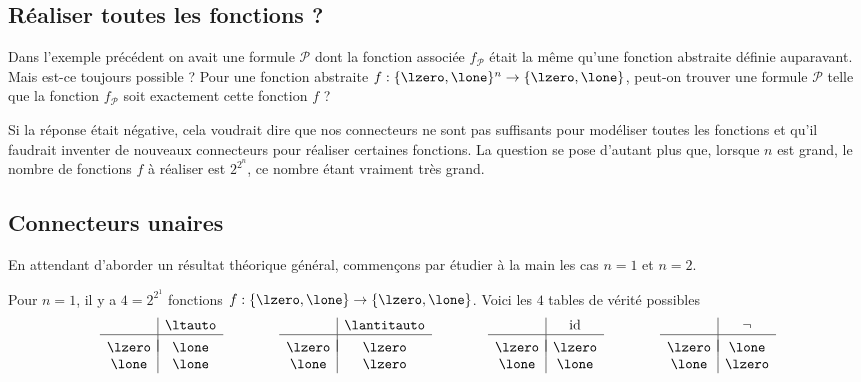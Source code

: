 \documentclass[11pt,class=report,crop=false]{standalone}
\begin{document}
\subsection{Réaliser toutes les fonctions ?}

Dans l'exemple précédent on avait une formule $\mathcal{P}$  dont la fonction associée $f_{\mathcal{P}}$ était la même qu'une fonction abstraite définie auparavant.
Mais est-ce toujours possible ?
Pour une fonction abstraite $f: \{\lzero,\lone\}^n \to \{\lzero,\lone\}$, peut-on trouver une formule $\mathcal{P}$ telle que la fonction $f_{\mathcal{P}}$ soit exactement cette fonction $f$ ?
	
Si la réponse était négative, cela voudrait dire que nos connecteurs ne sont pas suffisants pour modéliser toutes les fonctions et qu'il faudrait inventer de nouveaux connecteurs pour réaliser certaines fonctions.
La question se pose d'autant plus que, lorsque $n$ est grand, le nombre de fonctions $f$ à réaliser est $2^{2^n}$, ce nombre étant vraiment très grand. 	


\subsection{Connecteurs unaires}

En attendant d'aborder un résultat théorique général, commençons par étudier à la main les cas $n=1$ et $n=2$.

Pour $n=1$, il y a $4 = 2^{2^1}$ fonctions $f : \{\lzero,\lone\} \to \{\lzero,\lone\}$.
Voici les $4$ tables de vérité possibles 
\[
\begin{array}{c|c}
	& \ltauto \\
	\hline
	& \\[-2ex]
	\lzero & \lone \\
	\lone  & \lone \\
\end{array}
\qquad\qquad
\begin{array}{c|c}
	& \lantitauto \\
	\hline
	& \\[-2ex]
	\lzero & \lzero \\
	\lone  & \lzero \\
\end{array}
\qquad\qquad
\begin{array}{c|c}
	& \mathrm{id} \\
	\hline
	& \\[-2ex]
	\lzero & \lzero \\
	\lone  & \lone \\
\end{array}
\qquad\qquad
\begin{array}{c|c}
	& \lnot \\
	\hline
	& \\[-2ex]
	\lzero & \lone \\
	\lone  & \lzero \\
\end{array}
\]
\end{document}
